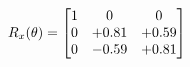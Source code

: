 \documentclass[preview]{standalone}
\begin{document}
\begin{align*}
\special{dvisvgm:raw <g id='unique000'>}R_{x}(\theta) = \begin{bmatrix}1 & 0 & 0 \\0 & +0.81 & +0.59 \\0 & -0.59 & +0.81\end{bmatrix}\special{dvisvgm:raw </g>}
\end{align*}
\end{document}
